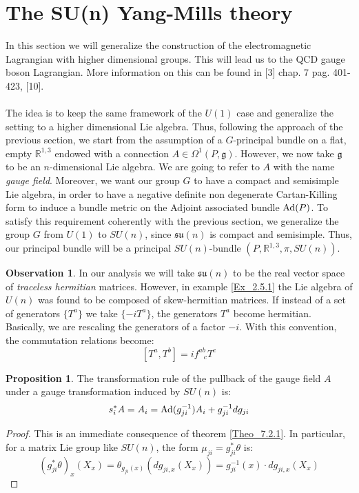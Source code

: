 \documentclass[12pt,a4paper]{report}
\theoremstyle{definition}
\theoremstyle{Theorem}
\newtheorem{Prop}[Def]{Proposition}
\theoremstyle{definition}
\theoremstyle{definition}
\newtheorem{Obs}[Def]{Observation}
\begin{document}
	\section{The SU(n) Yang-Mills theory}
	In this section we will generalize the construction of the electromagnetic Lagrangian with higher dimensional groups. This will lead us to the QCD gauge boson Lagrangian. More information on this can be found in [3] chap. 7 pag. 401-423, [10].
	\\\\
	The idea is to keep the same framework of the $U(1)$ case and generalize the setting to a higher dimensional Lie algebra. Thus, following the approach of the previous section, we start from the assumption of a $G$-principal bundle on a flat, empty $\mathbb{R}^{1,3}$ endowed with a connection $A\in \Omega^1(P,\mathfrak{g})$. However, we now take $\mathfrak{g}$ to be an $n$-dimensional Lie algebra. We are going to refer to $A$ with the name \textit{gauge field}. Moreover, we want our group $G$ to have a compact and semisimple Lie algebra, in order to have a negative definite non degenerate Cartan-Killing form to induce a bundle metric on the Adjoint associated bundle $\hbox{Ad}(P)$. To satisfy this requirement coherently with the previous section, we generalize the group $G$ from $U(1)$ to $SU(n)$, since $\mathfrak{su}(n)$ is compact and semisimple. Thus, our principal bundle will be a principal $SU(n)$-bundle $(P,\mathbb{R}^{1,3},\pi,SU(n))$.
	\begin{Obs}
		In our analysis we will take $\mathfrak{su}(n)$ to be the real vector space of \textit{traceless hermitian} matrices. However, in example \ref{Ex_2.5.1} the Lie algebra of $U(n)$ was found to be composed of skew-hermitian matrices. If instead of a set of generators $\{T^a\}$ we take $\{-iT^a\}$, the generators $T^a$ become hermitian. Basically, we are rescaling the generators of a factor $-i$.
		With this convention, the commutation relations become:
		$$[T^a,T^b]=if^{ab}_{\hspace{9pt}c}T^c$$
	\end{Obs}
	\begin{Prop}
		The transformation rule of the pullback of the gauge field $A$ under a gauge transformation induced by $SU(n)$ is:
		$$s_i^*A=A_i=\hbox{Ad}(g_{ji}^{-1})A_i+g^{-1}_{ji}dg_{ji}$$ 
	\end{Prop}
	\begin{proof}
		This is an immediate consequence of theorem \ref{Theo_7.2.1}. In particular, for a matrix Lie group like $SU(n)$, the form $\mu_{ji}=g_{ji}^*\theta$ is:
		$$(g_{ji}^*\theta)_x(X_x)=\theta_{g_{ji}(x)}(dg_{ji,x}(X_x))=g^{-1}_{ji}(x)\cdot dg_{ji,x}(X_x)$$
	\end{proof}
\end{document}
